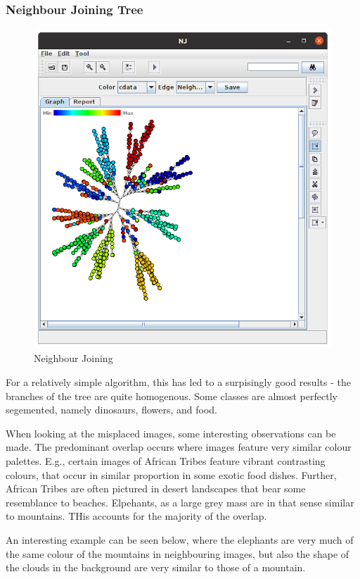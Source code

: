 \documentclass[ 10pt ]{fphw}
\begin{document}
\subsubsection*{Neighbour Joining Tree}
\begin{center}
\begin{figure}[H]
    \centering
	\includegraphics[width=0.75\columnwidth]{neighbourJoining.png} 
	\caption{Neighbour Joining}
	\label{fig:nj}
	\end{figure}
\end{center}

For a relatively simple algorithm, this has led to a surpisingly good results - the branches of the tree are quite homogenous. Some classes are almost perfectly segemented, namely dinosaurs, flowers, and food. 

When looking at the misplaced images, some interesting observations can be made. The predominant overlap occurs where images feature very similar colour palettes. E.g., certain images of African Tribes feature vibrant contrasting colours, that occur in similar proportion in some exotic food dishes. Further, African Tribes are often pictured in desert landscapes that bear some resemblance to beaches. Elpehants, as a large grey mass are in that sense similar to mountains. THis accounts for the majority of the overlap. 

An interesting example can be seen below, where the elephants are very much of the same colour of the mountains in neighbouring images, but also the shape of the clouds in the background are very similar to those of a mountain.
\end{document}
